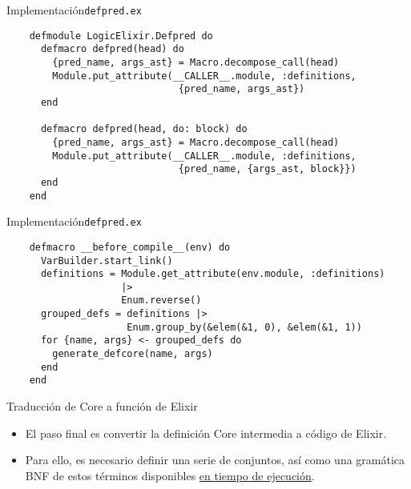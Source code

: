 \documentclass[14pt,aspectratio=169]{beamer}
\begin{document}
\begin{frame}[fragile]{Implementación}{\texttt{defpred.ex}}
  \footnotesize \begin{verbatim}
    defmodule LogicElixir.Defpred do
      defmacro defpred(head) do
        {pred_name, args_ast} = Macro.decompose_call(head)
        Module.put_attribute(__CALLER__.module, :definitions,
                              {pred_name, args_ast})
      end

      defmacro defpred(head, do: block) do
        {pred_name, args_ast} = Macro.decompose_call(head)
        Module.put_attribute(__CALLER__.module, :definitions,
                              {pred_name, {args_ast, block}})
      end
    end
  \end{verbatim}
\end{frame}

\begin{frame}[fragile]{Implementación}{\texttt{defpred.ex}}
  \footnotesize \begin{verbatim}
    defmacro __before_compile__(env) do
      VarBuilder.start_link()
      definitions = Module.get_attribute(env.module, :definitions)
                    |>
                    Enum.reverse()
      grouped_defs = definitions |>
                     Enum.group_by(&elem(&1, 0), &elem(&1, 1))
      for {name, args} <- grouped_defs do
        generate_defcore(name, args)
      end
    end
  \end{verbatim}
\end{frame}

\begin{frame}{Traducción de Core a función de Elixir}
  \begin{itemize}
    \item El paso final es convertir la definición Core intermedia a código de Elixir.
    \item Para ello, es necesario definir una serie de conjuntos, así como una
    gramática BNF de estos términos disponibles \underline{en tiempo de ejecución}.
  \end{itemize}
\end{frame}
\end{document}
